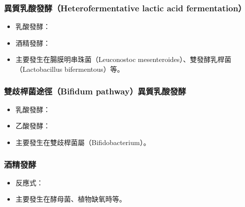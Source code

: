 \documentclass[a4paper,12pt]{report}
\begin{document}
\subsubsection{異質乳酸發酵（Heterofermentative lactic acid fermentation）}
  \begin{itemize}
  \item 乳酸發酵：
  \item 酒精發酵：
    \item 主要發生在腸膜明串珠菌（Leuconostoc mesenteroides）、雙發酵乳桿菌（Lactobacillus bifermentous）等。
\end{itemize}
\subsubsection{雙歧桿菌途徑（Bifidum pathway）異質乳酸發酵}
  \begin{itemize}
    \item 乳酸發酵：
    \item 乙酸發酵： 
    \item 主要發生在雙歧桿菌屬（Bifidobacterium）。
\end{itemize}
\subsubsection{酒精發酵}
  \begin{itemize}
    \item 反應式：
    \item 主要發生在酵母菌、植物缺氧時等。
\end{itemize}
\end{document}
